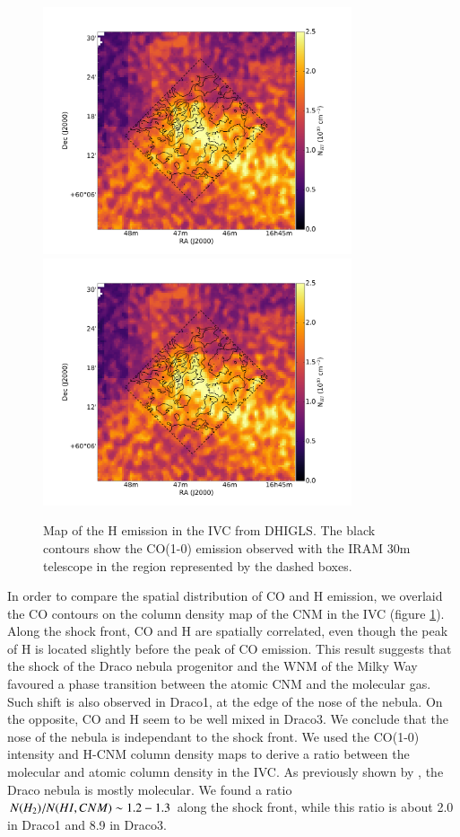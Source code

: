 \documentclass[traditabstract]{aa}
\begin{document}
\begin{figure}[h!]
  \includegraphics[page=5,width=9.1cm,trim=65 30 125 75,clip=true]{Figures/HI-CO.pdf}
  \includegraphics[page=6,width=9.1cm,trim=65 30 125 75,clip=true]{Figures/HI-CO.pdf}
  \caption{\label{DRAO-CO} Map of the H emission in the IVC from DHIGLS. The black contours show the CO(1-0) emission observed with the IRAM 30m telescope in the region represented by the dashed boxes.}
\end{figure}

   In order to compare the spatial distribution of CO and H emission, we overlaid the CO contours on the column density map of the CNM in the IVC (figure \ref{DRAO-CO}). Along the shock front, CO and H are spatially correlated, even though the peak of H is located slightly before the peak of CO emission. This result suggests that the shock of the Draco nebula progenitor and the WNM of the Milky Way favoured a phase transition between the atomic CNM and the molecular gas.
Such shift is also observed in Draco1, at the edge of the nose of the nebula. On the opposite, CO and H seem to be well mixed in Draco3. We conclude that the nose of the nebula is independant to the shock front.
We used the CO(1-0) intensity and H-CNM column density maps to derive a ratio between the molecular and atomic column density in the IVC. As previously shown by \cite{Planck_XXIV_2011,MAMD_2017b}, the Draco nebula is mostly molecular. We found a ratio $N(H_2)/N(H\rmnum{1},CNM)\sim 1.2-1.3$ along the shock front, while this ratio is about 2.0 in Draco1 and 8.9 in Draco3.
\end{document}
